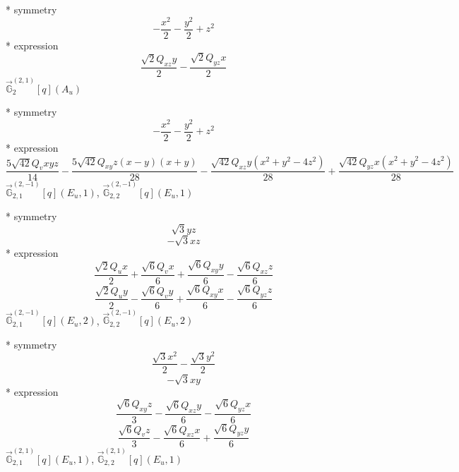 \documentclass[fleqn,8pt]{jsarticle}
\begin{document}
\noindent\quad ** symmetry
\begin{dmath*}
- \frac{x^{2}}{2} - \frac{y^{2}}{2} + z^{2}
\end{dmath*}
\noindent\quad ** expression
\begin{dmath*}
\frac{\sqrt{2} Q_{xz} y}{2} - \frac{\sqrt{2} Q_{yz} x}{2}
\end{dmath*}
\noindent\quad $\vec{\mathbb{G}}_{2}^{(2,1)}[q](A_{u})$

\noindent\quad ** symmetry
\begin{dmath*}
- \frac{x^{2}}{2} - \frac{y^{2}}{2} + z^{2}
\end{dmath*}
\noindent\quad ** expression
\begin{dmath*}
\frac{5 \sqrt{42} Q_{v} x y z}{14} - \frac{5 \sqrt{42} Q_{xy} z \left(x - y\right) \left(x + y\right)}{28} - \frac{\sqrt{42} Q_{xz} y \left(x^{2} + y^{2} - 4 z^{2}\right)}{28} + \frac{\sqrt{42} Q_{yz} x \left(x^{2} + y^{2} - 4 z^{2}\right)}{28}
\end{dmath*}
\noindent\quad $\vec{\mathbb{G}}_{2,1}^{(2,-1)}[q](E_{u},1)$, $\vec{\mathbb{G}}_{2,2}^{(2,-1)}[q](E_{u},1)$

\noindent\quad ** symmetry
\begin{dmath*}
\sqrt{3} y z
\end{dmath*}
\begin{dmath*}
- \sqrt{3} x z
\end{dmath*}
\noindent\quad ** expression
\begin{dmath*}
\frac{\sqrt{2} Q_{u} x}{2} + \frac{\sqrt{6} Q_{v} x}{6} + \frac{\sqrt{6} Q_{xy} y}{6} - \frac{\sqrt{6} Q_{xz} z}{6}
\end{dmath*}
\begin{dmath*}
\frac{\sqrt{2} Q_{u} y}{2} - \frac{\sqrt{6} Q_{v} y}{6} + \frac{\sqrt{6} Q_{xy} x}{6} - \frac{\sqrt{6} Q_{yz} z}{6}
\end{dmath*}
\noindent\quad $\vec{\mathbb{G}}_{2,1}^{(2,-1)}[q](E_{u},2)$, $\vec{\mathbb{G}}_{2,2}^{(2,-1)}[q](E_{u},2)$

\noindent\quad ** symmetry
\begin{dmath*}
\frac{\sqrt{3} x^{2}}{2} - \frac{\sqrt{3} y^{2}}{2}
\end{dmath*}
\begin{dmath*}
- \sqrt{3} x y
\end{dmath*}
\noindent\quad ** expression
\begin{dmath*}
\frac{\sqrt{6} Q_{xy} z}{3} - \frac{\sqrt{6} Q_{xz} y}{6} - \frac{\sqrt{6} Q_{yz} x}{6}
\end{dmath*}
\begin{dmath*}
\frac{\sqrt{6} Q_{v} z}{3} - \frac{\sqrt{6} Q_{xz} x}{6} + \frac{\sqrt{6} Q_{yz} y}{6}
\end{dmath*}
\noindent\quad $\vec{\mathbb{G}}_{2,1}^{(2,1)}[q](E_{u},1)$, $\vec{\mathbb{G}}_{2,2}^{(2,1)}[q](E_{u},1)$
\end{document}
